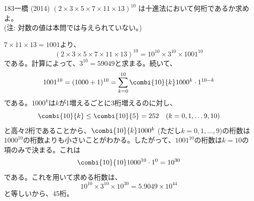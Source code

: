 \begin{prob}{183}{}{一橋 (2014)}
 $(2\times3\times5\times7\times11\times13)^{10}$ は十進法において何桁であるか求めよ。 \\
 (注: 対数の値は本問では与えられていない。)
\end{prob}

$7\times11\times13=1001$より、
\[ (2\times3\times5\times7\times11\times13)^{10}=10^{10}\times3^{10}\times1001^{10} \]
である。計算によって、$3^{10}=59049$と求まる。続いて、
\begin{align*}
 1001^{10}=(1000+1)^{10}=\sum_{k=0}^{10} \combi{10}{k}1000^k\cdot1^{10-k}
\end{align*}
である。$1000^k$は$k$が1増えるごとに3桁増えるのに対し、
\[ \combi{10}{k}\le \combi{10}{5}=252 \quad(k=0,1,\dots 9,10) \]
と高々2桁であることから、$\combi{10}{k}1000^k$ (ただし$k=0,1,\dots, 9$)の桁数は$1000^{10}$の桁数よりも小さいことがわかる。したがって、$1001^{10}$の桁数は$k=10$の項のみで決まる。これは
\[ \combi{10}{10}1000^{10}\cdot1^0=10^{30} \]
である。これを用いて求める桁数は、
\[ 10^{10}\times3^{10}\times10^{30}=5.9049\times10^{44} \]
と等しいから、45桁。